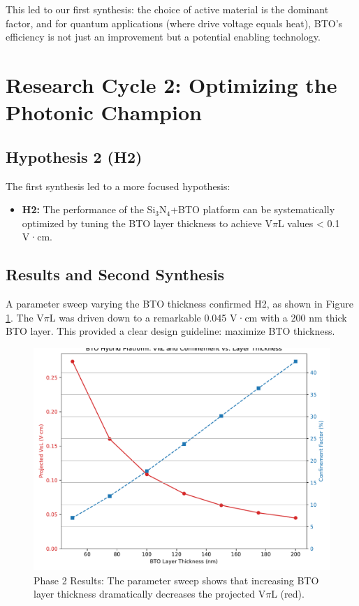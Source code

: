\documentclass[conference]{IEEEtran} %
\begin{document}
This led to our first synthesis: the choice of active material is the dominant factor, and for quantum applications (where drive voltage equals heat), BTO's efficiency is not just an improvement but a potential enabling technology.

\section{Research Cycle 2: Optimizing the Photonic Champion}
\subsection{Hypothesis 2 (H2)}
The first synthesis led to a more focused hypothesis:
\begin{itemize}
    \item \textbf{H2:} The performance of the Si$_3$N$_4$+BTO platform can be systematically optimized by tuning the BTO layer thickness to achieve V$\pi$L values < 0.1 V·cm.
\end{itemize}

\subsection{Results and Second Synthesis}
A parameter sweep varying the BTO thickness confirmed H2, as shown in Figure \ref{fig:sweep}. The V$\pi$L was driven down to a remarkable 0.045 V·cm with a 200 nm thick BTO layer. This provided a clear design guideline: maximize BTO thickness.

\begin{figure}[H]
    \centering
    \includegraphics[width=\linewidth]{simulation_v2_optimization_sweep.pdf}
    \caption{Phase 2 Results: The parameter sweep shows that increasing BTO layer thickness dramatically decreases the projected V$\pi$L (red).}
    \label{fig:sweep}
\end{figure}
\end{document}
